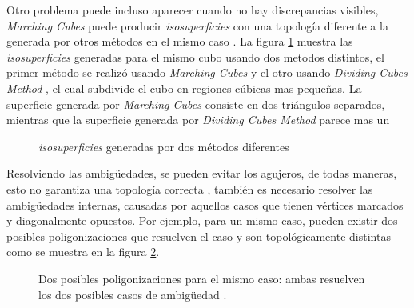 Otro problema puede incluso aparecer cuando no hay discrepancias visibles, \emph{Marching Cubes} puede producir \emph{isosuperficies} con una topología diferente a la generada por otros métodos en el mismo caso \cite{Chernyaev95marchingcubes}. La figura \ref{f:estadoDelArte:Chernyaev95marchingcubes_2} muestra las \emph{isosuperficies} generadas para el mismo cubo usando dos metodos distintos, el primer método se realizó usando \emph{Marching Cubes} y el otro usando \emph{Dividing Cubes Method} \cite{Cline88twoalgorithms}, el cual subdivide el cubo en regiones cúbicas mas pequeñas. La superficie generada por \emph{Marching Cubes} consiste en dos triángulos separados, mientras que la superficie generada por \emph{Dividing Cubes Method} parece mas un 

\begin{figure}[tb]
\centering
\caption{\emph{isosuperficies} generadas por dos métodos diferentes \cite{Chernyaev95marchingcubes}}
\label{f:estadoDelArte:Chernyaev95marchingcubes_2}
\end{figure}

Resolviendo las ambigüedades, se pueden evitar los agujeros, de todas maneras, esto no garantiza una topología correcta \cite{Lewiner03efficientimplementation}, también es necesario resolver las ambigüedades internas, causadas por aquellos casos que tienen vértices marcados y diagonalmente opuestos. Por ejemplo, para un mismo caso, pueden existir dos posibles poligonizaciones que resuelven el caso y son topológicamente distintas como se muestra en la figura \ref{f:estadoDelArte:Lewiner03efficientimplementation_2}.

\begin{figure}[!htb]
\centering
\caption[Dos posibles poligonizaciones para el mismo caso: ambas resuelven los dos posibles casos de ambigüedad]{Dos posibles poligonizaciones para el mismo caso: ambas resuelven los dos posibles casos de ambigüedad \cite{Lewiner03efficientimplementation}.}
\label{f:estadoDelArte:Lewiner03efficientimplementation_2}
\end{figure}

